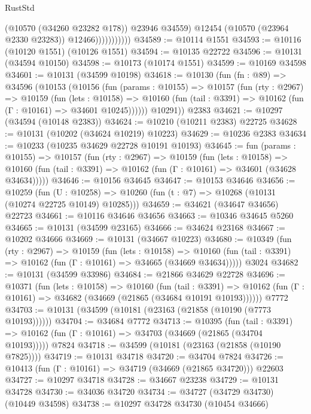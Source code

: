 \begin{lexlean}{RustStd}
\begin{coremodule}
                            (@10570 (@34260 @23282 @178))
                            @23946
                            @34559)
                          @12454
                          (@10570 (@23964 @2330 @23283))
                          @12466)))))))))))
@34589 := @10114 @1551
@34593 := @10116 (@10120 @1551) (@10126 @1551)
@34594 := @10135 @22722
@34596 := @10131 (@34594 @10150)
@34598 := @10173 (@10174 @1551)
@34599 := @10169 @34598
@34601 := @10131 (@34599 @10198)
@34618 := @10130
    (fun (fn : @89) =>
    @34596
      (@10153
        (@10156
          (fun (params : @10155) =>
          @10157
            (fun (rty : @2967) =>
            @10159
              (fun (lets : @10158) =>
              @10160 (fun (tail : @3391) => @10162 (fun (Γ : @10161) => @34601 @10245))))))
        @10291))
    @2383
@34621 := @10297 (@34594 (@10148 @2383))
@34624 := @10210 (@10211 @2383) @22725
@34628 := @10131 (@10202 (@34624 @10219) @10223)
@34629 := @10236 @2383
@34634 := @10233 (@10235 @34629 @22728 @10191 @10193)
@34645 := fun (params : @10155) =>
  @10157
    (fun (rty : @2967) =>
    @10159
      (fun (lets : @10158) =>
      @10160 (fun (tail : @3391) => @10162 (fun (Γ : @10161) => @34601 (@34628 @34634)))))
@34646 := @10156 @34645
@34647 := @10153 @34646
@34656 := @10259
    (fun (U : @10258) => @10260 (fun (t : @7) => @10268 (@10131 (@10274 @22725 @10149) @10285)))
@34659 := @34621 (@34647 @34656) @22723
@34661 := @10116 @34646 @34656
@34663 := @10346 @34645 @5260
@34665 := @10131 (@34599 @23165)
@34666 := @34624 @23168
@34667 := @10202 @34666
@34669 := @10131 (@34667 @10223)
@34680 := @10349
    (fun (rty : @2967) =>
    @10159
      (fun (lets : @10158) =>
      @10160 (fun (tail : @3391) => @10162 (fun (Γ : @10161) => @34665 (@34669 @34634)))))
    @3024
@34682 := @10131 (@34599 @33986)
@34684 := @21866 @34629 @22728
@34696 := @10371
    (fun (lets : @10158) =>
    @10160
      (fun (tail : @3391) =>
      @10162 (fun (Γ : @10161) => @34682 (@34669 (@21865 (@34684 @10191 @10193))))))
    @7772
@34703 := @10131 (@34599 (@10181 (@23163 (@21858 (@10190 (@7773 @10193))))))
@34704 := @34684 @7772
@34713 := @10395
    (fun (tail : @3391) => @10162 (fun (Γ : @10161) => @34703 (@34669 (@21865 (@34704 @10193)))))
    @7824
@34718 := @34599 (@10181 (@23163 (@21858 (@10190 @7825))))
@34719 := @10131 @34718
@34720 := @34704 @7824
@34726 := @10413 (fun (Γ : @10161) => @34719 (@34669 (@21865 @34720))) @22603
@34727 := @10297 @34718
@34728 := @34667 @23238
@34729 := @10131 @34728
@34730 := @34036 @34720
@34734 := @34727 (@34729 @34730) (@10449 @34598)
@34738 := @10297 @34728 @34730 (@10454 @34666)

\end{coremodule}
\end{lexlean}
